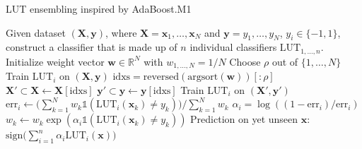 \begin{algorithm}
  \caption{LUT ensembling inspired by AdaBoost.M1}\label{alg:lut_ensemble_ada}
  \begin{algorithmic}[1]
    \State Given dataset $(\bm{X}, \bm{y})$, where $\bm{X} = \bm{x}_1, \dots, \bm{x}_N$ and $\bm{y} = y_1, \dots, y_N$, $y_i \in \{-1, 1\}$, construct a classifier that is made up of $n$ individual classifiers $\text{LUT}_{1, \dots, n}$.
    \vspace{1em}
    \State Initialize weight vector $\bm{w} \in \mathds{R}^N$ with $w_{1, \dots, N} = 1/N$
    \State Choose $\rho$ out of $\{1, \dots, N\}$
    \vspace{0.5em}
     \label{alg_ref:lut_ensemble_ada:mod_begin}
      \State Train $\text{LUT}_i$ on $(\bm{X},\bm{y})$
    \Else
    \State $\text{idxs} = \text{reversed}(\text{argsort}(\bm{w}))[:\rho]$
    \State $\bm{X}' \subset \bm{X} \gets \bm{X}[\text{idxs}]$
    \State $\bm{y}' \subset \bm{y} \gets \bm{y}[\text{idxs}]$
      \State Train $\text{LUT}_i$ on $(\bm{X}', \bm{y}')$
      \EndIf \label{alg_ref:lut_ensemble_ada:mod_end}
    \State $\text{err}_i \gets \big( \sum_{k=1}^N w_k \mathbb{1}(\text{LUT}_i(\bm{x}_k) \neq y_k) \big) / \sum_{k=1}^N w_k$
    \State $\alpha_i = \log((1 - \text{err}_i) / \text{err}_i)$
    \State $w_k \gets w_k \exp(\alpha_i \mathbb{1}(\text{LUT}_i(\bm{x}_k) \neq y_k))$
    \EndFor
    \EndFor
    \State Prediction on yet unseen $\bm{x}$: $\text{sign} \big( \sum_{i = 1}^n \alpha_i \text{LUT}_i(\bm{x}) \big)$
  \end{algorithmic}
\end{algorithm}
\FloatBarrier

